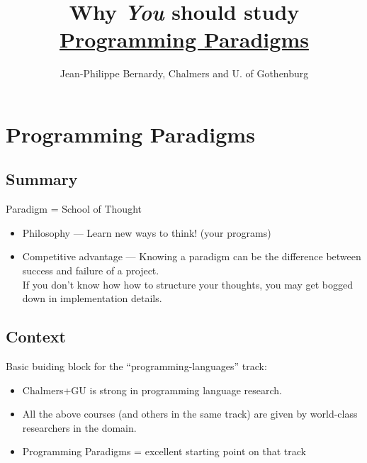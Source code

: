 \documentclass[utf8x,compress,hyperref]{beamer}
\title[Study AFP in SP 3 (Jan-Mar)!]{Why \emph{You} should study\\\href{http://www.student.chalmers.se/sp/course?course_code=TDA342}{Programming Paradigms}}
\author[JP Bernardy, Chalmers and GU]{Jean-Philippe Bernardy, Chalmers and U. of Gothenburg}
\begin{document}
\section{Programming Paradigms}
\subsection{Summary}
\begin{frame}
\maketitle
Paradigm = School of Thought
\begin{itemize}
\item Philosophy --- Learn new ways to think! (your programs)
\item Competitive advantage --- Knowing a paradigm can be the
  difference between success and failure of a project. \\
If you don't know how how to structure your thoughts, you may get
bogged down in implementation details.
\end{itemize}

\end{frame}

\subsection{Context}
\begin{frame}

Basic buiding block for the ``programming-languages'' track:

\hspace{2cm}

\begin{itemize}
\item Chalmers+GU is strong in programming language research.
\item All the above courses (and others in the same track) are given
  by world-class researchers in the domain.
\item Programming Paradigms = excellent starting point on that track
\end{itemize}

\end{frame}
\end{document}
